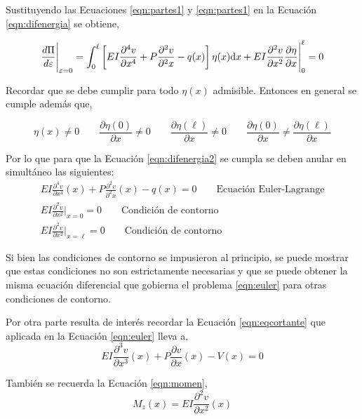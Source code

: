 Sustituyendo las Ecuaciones \eqref{eqn:partes1} y \eqref{eqn:partes1} en la Ecuación \eqref{eqn:difenergia} se obtiene,

\begin{equation}\label{eqn:difenergia2}
\frac{d\Pi}{d\varepsilon} \Bigg|_{\varepsilon=0} = \int_0^\ell \left[ EI \frac{\partial^4 v}{\partial x^4} + P \frac{\partial^2 v}{\partial^2 x} - q(x)  \right] \eta(x) {\text{d}} x + EI\frac{\partial^2 v}{\partial x^2} \frac{\partial \eta}{\partial x}\Bigg|_0^\ell = 0
\end{equation}

Recordar que se debe cumplir para todo $\eta(x)$ admisible. Entonces en general se cumple además que, 

$$
\eta(x)\neq0 
\qquad
\frac{\partial \eta(0)}{\partial x} \neq 0
\qquad
\frac{\partial \eta(\ell)}{\partial x} \neq 0
\qquad 
\frac{\partial \eta(0)}{\partial x} \neq \frac{\partial \eta(\ell)}{\partial x}
$$

Por lo que para que la Ecuación \eqref{eqn:difenergia2} se cumpla se deben anular en simultáneo las siguientes:
\begin{eqnarray}
EI \frac{\partial^4 v}{\partial x^4}(x) + P \frac{\partial^2 v}{\partial^2 x}(x) - q(x) = 0 \qquad \text{Ecuación Euler-Lagrange} \label{eqn:euler} \\
EI\frac{\partial^2 v}{\partial x^2}\Bigg|_{x=0}=0 \qquad \text{Condición de contorno} \label{eqn:contorno1} \\
EI\frac{\partial^2 v}{\partial x^2}\Bigg|_{x=\ell}=0 \qquad \text{Condición de contorno} \label{eqn:contorno2}
\end{eqnarray}

Si bien las condiciones de contorno se impusieron al principio, se puede mostrar que estas condiciones no son estrictamente necesarias y que se puede obtener la misma ecuación diferencial que gobierna el problema \eqref{eqn:euler} para otras condiciones de contorno.

Por otra parte resulta de interés recordar la Ecuación \eqref{eqn:eqcortante} que aplicada en la Ecuación \eqref{eqn:euler} lleva a,
\begin{equation}\label{eqn:condcortante}
EI \frac{\partial^3 v}{\partial x^3}(x) + P \frac{\partial v}{\partial x}(x) - V(x) = 0
\end{equation}

También se recuerda la Ecuación \eqref{eqn:momen},  
\begin{equation}\label{eqn:condmomento}
M_z (x) = E I \frac{\partial^2 v}{\partial x^2}(x)
\end{equation}

